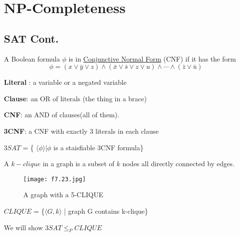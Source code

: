 \chapter{NP-Completeness}

\section{SAT Cont.}

\begin{definition}
    A Boolean formula \(\phi\) is in \underline{Conjunctive Normal Form} (CNF) if it has the form
    \[
        \phi = (x \lor \bar{y} \lor z) \land (\bar{x} \lor \bar{s} \lor z \lor u) \land \cdots \land (\bar{z} \lor \bar{u})
    \]

    \textbf{Literal} : a variable or a negated variable

    \textbf{Clause}: an OR of literals (the thing in a brace)
    
    \textbf{CNF}: an AND of clauses(all of them).
    
    \textbf{3CNF}: a CNF with exactly 3 literals in each clause 

    \(3SAT\) = \{ \(\langle \phi \rangle | \phi\) is a staisfiable 3CNF formula\} 
\end{definition}

\begin{definition}
    A \(k-clique\) in a graph is a subset of \(k\) nodes all directly connected by edges.   

    \begin{example}
        \begin{figure}[H]
            \centering
            \texttt{[image: f7.23.jpg]}
            \caption{A graph with a 5-CLIQUE}
        \end{figure}
    \end{example}

    \(CLIQUE\) = \{\(\langle G, k \rangle\) | graph G contains k-clique\} 
\end{definition}

We will show \(3SAT \leq_P CLIQUE\) 

